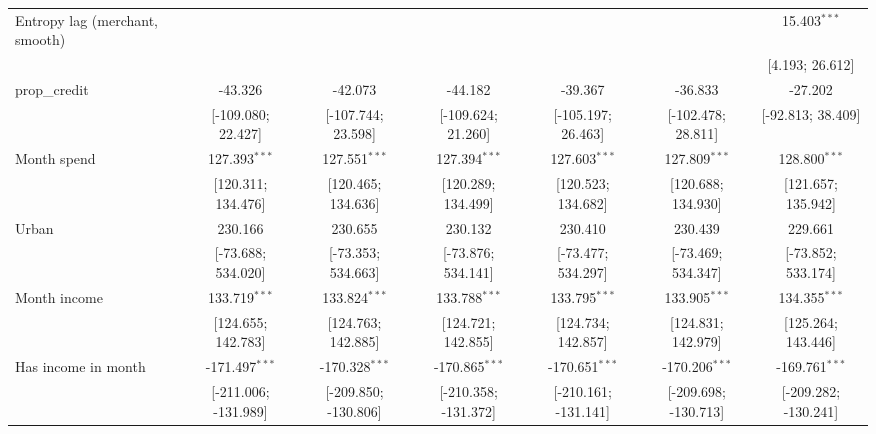\begin{table}[htbp]
\begin{threeparttable}[b]
\begin{tabular}{lcccccc}
         Entropy lag (merchant, smooth) &                      &                      &                      &                      &                      & 15.403$^{***}$\\   
                                        &                      &                      &                      &                      &                      & [4.193; 26.612]\\   
         prop\_credit                   & -43.326              & -42.073              & -44.182              & -39.367              & -36.833              & -27.202\\   
                                        & [-109.080; 22.427]   & [-107.744; 23.598]   & [-109.624; 21.260]   & [-105.197; 26.463]   & [-102.478; 28.811]   & [-92.813; 38.409]\\   
         Month spend                    & 127.393$^{***}$      & 127.551$^{***}$      & 127.394$^{***}$      & 127.603$^{***}$      & 127.809$^{***}$      & 128.800$^{***}$\\   
                                        & [120.311; 134.476]   & [120.465; 134.636]   & [120.289; 134.499]   & [120.523; 134.682]   & [120.688; 134.930]   & [121.657; 135.942]\\   
         Urban                          & 230.166              & 230.655              & 230.132              & 230.410              & 230.439              & 229.661\\   
                                        & [-73.688; 534.020]   & [-73.353; 534.663]   & [-73.876; 534.141]   & [-73.477; 534.297]   & [-73.469; 534.347]   & [-73.852; 533.174]\\   
         Month income                   & 133.719$^{***}$      & 133.824$^{***}$      & 133.788$^{***}$      & 133.795$^{***}$      & 133.905$^{***}$      & 134.355$^{***}$\\   
                                        & [124.655; 142.783]   & [124.763; 142.885]   & [124.721; 142.855]   & [124.734; 142.857]   & [124.831; 142.979]   & [125.264; 143.446]\\   
         Has income in month            & -171.497$^{***}$     & -170.328$^{***}$     & -170.865$^{***}$     & -170.651$^{***}$     & -170.206$^{***}$     & -169.761$^{***}$\\   
                                        & [-211.006; -131.989] & [-209.850; -130.806] & [-210.358; -131.372] & [-210.161; -131.141] & [-209.698; -130.713] & [-209.282; -130.241]\\   

\end{tabular}
\end{threeparttable}
\end{table}
